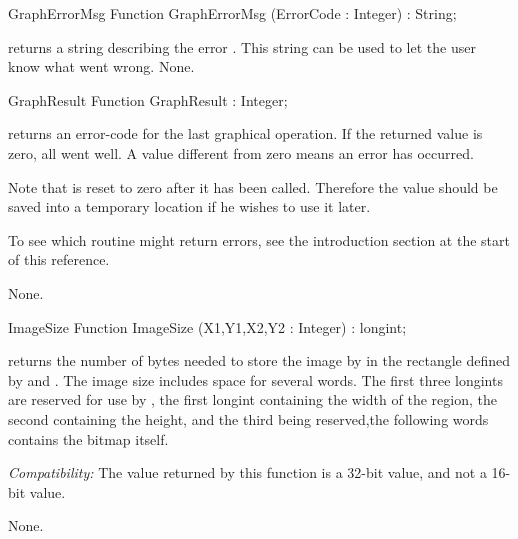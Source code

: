 \begin{function}{GraphErrorMsg}
\Declaration
Function GraphErrorMsg (ErrorCode : Integer) : String;

\Description
{}
returns a string describing the error . This string can be
used to let the user know what went wrong.
\Errors
None.
\SeeAlso
{}
\end{function}
\begin{function}{GraphResult}
\Declaration
Function GraphResult  : Integer;

\Description
{} returns an error-code for
the last graphical operation. If the returned value is zero, all went well.
A value different from zero means an error has occurred.

Note that  is reset to zero after it has been called.
Therefore the value should be saved into a temporary location if he wishes
to use it later.

To see which routine might return errors, see the introduction section at
the start of this reference.

\Errors
None.
\SeeAlso
{}
\end{function}

\begin{function}{ImageSize}
\Declaration
Function ImageSize (X1,Y1,X2,Y2 : Integer) : longint;

\Description
{} returns the number of bytes needed to store the image
by  in the rectangle defined by  and .
The image size includes space for several words. The first three longints
are reserved for use by , the first longint containing the
width of the region, the second containing the height, and the third being
reserved,the following words contains the bitmap itself.

\textit{Compatibility:}
 The value returned by this function is a 32-bit value,
 and not a 16-bit value.

\Errors
None.
\SeeAlso
{}
\end{function}

